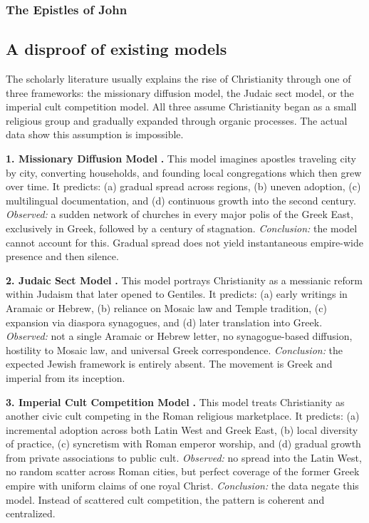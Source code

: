\subsubsection{The Epistles of John}\label{subsec:the-epistles-of-john}

\subsection{A disproof of existing models}\label{subsec:a-disproof-of-existing-models}

The scholarly literature usually explains the rise of Christianity through one of three frameworks: the missionary diffusion model, the Judaic sect model, or the imperial cult competition model.
All three assume Christianity began as a small religious group and gradually expanded through organic processes.
The actual data show this assumption is impossible.

\textbf{1. Missionary Diffusion Model} \cite{harnack:mission,stark:rise}\textbf{.}
This model imagines apostles traveling city by city, converting households, and founding local congregations which then grew over time.
It predicts: (a) gradual spread across regions, (b) uneven adoption, (c) multilingual documentation, and (d) continuous growth into the second century.
\emph{Observed:} a sudden network of churches in every major polis of the Greek East, exclusively in Greek, followed by a century of stagnation.
\emph{Conclusion:} the model cannot account for this. Gradual spread does not yield instantaneous empire-wide presence and then silence.

\textbf{2. Judaic Sect Model} \cite{eisenman:james,sanders:jesus,vermes:jesus}\textbf{.}
This model portrays Christianity as a messianic reform within Judaism that later opened to Gentiles.
It predicts: (a) early writings in Aramaic or Hebrew, (b) reliance on Mosaic law and Temple tradition, (c) expansion via diaspora synagogues, and (d) later translation into Greek.
\emph{Observed:} not a single Aramaic or Hebrew letter, no synagogue-based diffusion, hostility to Mosaic law, and universal Greek correspondence.
\emph{Conclusion:} the expected Jewish framework is entirely absent. The movement is Greek and imperial from its inception.

\textbf{3. Imperial Cult Competition Model} \cite{friesen:imperial,harland:associations}\textbf{.}
This model treats Christianity as another civic cult competing in the Roman religious marketplace.
It predicts: (a) incremental adoption across both Latin West and Greek East, (b) local diversity of practice, (c) syncretism with Roman emperor worship, and (d) gradual growth from private associations to public cult.
\emph{Observed:} no spread into the Latin West, no random scatter across Roman cities, but perfect coverage of the former Greek empire with uniform claims of one royal Christ.
\emph{Conclusion:} the data negate this model. Instead of scattered cult competition, the pattern is coherent and centralized.

